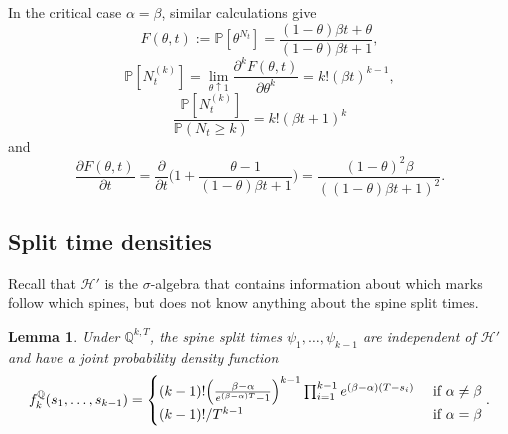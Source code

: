 \documentclass{article}
\theoremstyle{plain}
\newtheorem{lem}[thm]{Lemma}
\theoremstyle{definition}
\newcommand{\Q}{\mathbb{Q}}
\renewcommand{\P}{\mathbb{P}}
\begin{document}
In the critical case $\alpha=\beta$, similar calculations give
\begin{equation}\label{critBDpgf}
F(\theta,t) := \P[\theta^{N_t}] = \frac{(1-\theta)\beta t + \theta}{(1-\theta)\beta t + 1},
\end{equation}
\begin{equation}\label{critBDratio}
\P[N_t^{(k)}] = \lim_{\theta\uparrow 1} \frac{\partial^k F(\theta,t)}{\partial \theta^k} = k! (\beta t)^{k-1},
\end{equation}
\begin{equation}\label{critBDcond}
\frac{\P[N_t^{(k)}]}{\P(N_t\ge k)} = k! (\beta t+1)^k
\end{equation}
and
\begin{equation}\label{critBDpartialt}
\frac{\partial F(\theta,t)}{\partial t} = \frac{\partial}{\partial t} \Big(1+\frac{\theta-1}{(1-\theta)\beta t+1}\Big) = \frac{(1-\theta)^2\beta}{((1-\theta)\beta t+1)^2}.
\end{equation}




\subsection{Split time densities}

Recall that $\mathcal H'$ is the $\sigma$-algebra that contains information about which marks follow which spines, but does not know anything about the spine split times.

\begin{lem}\label{Qsplitdist}
Under $\Q^{k,T}$, the spine split times $\psi_1,\ldots,\psi_{k-1}$ are independent of $\mathcal H'$ and have a joint probability density function
\[f^\Q_k(s_1,\ldots,s_{k-1}) = \begin{cases} (k-1)! \Big(\frac{\beta-\alpha}{e^{(\beta-\alpha)T}-1}\Big)^{k-1} \prod_{i=1}^{k-1} e^{(\beta-\alpha)(T-s_i)} & \hbox{ if } \alpha\neq \beta\\
											 (k-1)!/T^{k-1} & \hbox{ if } \alpha = \beta\end{cases}.\]
\end{lem}
\end{document}
